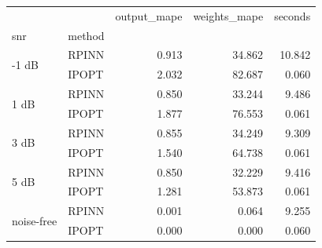 \begin{tabular}{llrrr}
\toprule
 &  & output_mape & weights_mape & seconds \\
snr & method &  &  &  \\
\midrule
\multirow[t]{2}{*}{-1 dB} & RPINN & 0.913 & 34.862 & 10.842 \\
 & IPOPT & 2.032 & 82.687 & 0.060 \\
\cline{1-5}
\multirow[t]{2}{*}{1 dB} & RPINN & 0.850 & 33.244 & 9.486 \\
 & IPOPT & 1.877 & 76.553 & 0.061 \\
\cline{1-5}
\multirow[t]{2}{*}{3 dB} & RPINN & 0.855 & 34.249 & 9.309 \\
 & IPOPT & 1.540 & 64.738 & 0.061 \\
\cline{1-5}
\multirow[t]{2}{*}{5 dB} & RPINN & 0.850 & 32.229 & 9.416 \\
 & IPOPT & 1.281 & 53.873 & 0.061 \\
\cline{1-5}
\multirow[t]{2}{*}{noise-free} & RPINN & 0.001 & 0.064 & 9.255 \\
 & IPOPT & 0.000 & 0.000 & 0.060 \\
\cline{1-5}
\bottomrule
\end{tabular}

